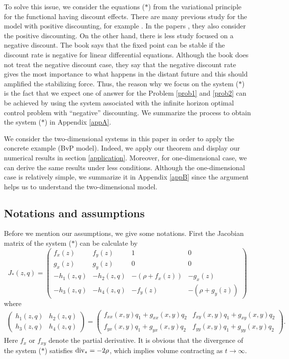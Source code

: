 \documentclass[11pt,reqno]{amsart}
\begin{document}
To solve this issue, we consider the equations ($\ast$) from the variational principle for the functional having discount effects. There are many previous study for the model with positive discounting, for example \cite{Kamien, Carlson, Aseev1}. In the papers \cite{Brock,Haurie,Gaitsgory}, they also consider the positive discounting. On the other hand, there is less study focused on a negative discount. The book \cite{Kamien} says that the fixed point can be stable if the discount rate is negative for linear differential equations. Although the book \cite{Carlson} does not treat the negative discount case, they say that the negative discount rate gives the most importance to what happens in the distant future and this should amplified the stabilizing force. Thus, the reason why we focus on the system ($\ast$) is the fact that we expect one of answer for the Problem \ref{prob1} and \ref{prob2} can be achieved by using the system associated with the infinite horizon optimal control problem with ``negative'' discounting. We summarize the process to obtain the system ($\ast$) in Appendix \ref{appA}.

We consider the two-dimensional systems in this paper in order to apply the concrete example (BvP model). Indeed, we apply our theorem and display our numerical results in section \ref{application}. Moreover, for one-dimensional case, we can derive the same results under less conditions. Although the one-dimensional case is relatively simple, we summarize it in Appendix \ref{appB} since the argument helps us to understand the two-dimensional model.


\subsection{Notations and assumptions}

Before we mention our assumptions, we give some notations. First the Jacobian matrix of the system ($\ast$) can be calculate by
$$
J_*(z,q)=\begin{pmatrix}
f_x(z) & f_y(z) & 1 & 0 \\
g_x(z) & g_y(z) & 0 & 0 \\
-h_1(z,q) & -h_2(z,q) & -(\rho+f_x(z)) & -g_x(z) \\
-h_3(z,q) & -h_4(z,q) & -f_y(z) & -(\rho+g_y(z)) 
\end{pmatrix}
$$
where
\begin{eqnarray}
\begin{pmatrix}
h_1(z,q) & h_2(z,q)  \\
h_3(z,q) & h_4(z,q)  
\end{pmatrix}
=
\begin{pmatrix}
f_{xx}(x,y)q_1+g_{xx}(x,y)q_2 & f_{xy}(x,y)q_1+g_{xy}(x,y)q_2 \\
f_{yx}(x,y)q_1+g_{yx}(x,y)q_2 & f_{yy}(x,y)q_1+g_{yy}(x,y)q_2
\end{pmatrix}.\label{hessian}
\end{eqnarray}
Here $f_x$ or $f_{xy}$ denote the partial derivative. It is obvious that the divergence of the system ($\ast$) satisfies
${\rm div}_*=-2\rho$, which implies volume contracting as $t\to\infty$.
\end{document}
